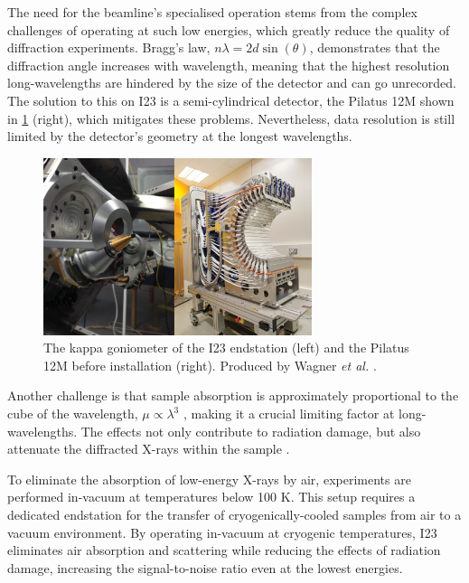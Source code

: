 The need for the beamline's specialised operation stems from the complex challenges of operating at such low energies, which greatly reduce the quality of diffraction experiments.
Bragg’s law, $nλ = 2d \sin(\theta)$, demonstrates that the diffraction angle increases with wavelength, meaning that the highest resolution long-wavelengths are hindered by the size of the detector and can go unrecorded. %
The solution to this on I23 is a semi-cylindrical detector, the Pilatus 12M shown in \cref{fig:gonio_and_detector} (right), which mitigates these problems. Nevertheless, data resolution is still limited by the detector’s geometry at the longest wavelengths.

\begin{figure}
    \centering
    \includegraphics[width = 0.7\textwidth]{images/goniometer&detector.PNG}
    \caption{The kappa goniometer of the I23 endstation (left) and the Pilatus 12M before installation (right). Produced by Wagner \textit{et al.} \cite{Wagner2016}.}
    \label{fig:gonio_and_detector}
\end{figure}

 Another challenge is that sample absorption is approximately proportional to the cube of the wavelength, $\mu \propto \lambda^3$ \cite{Arndt1984}, making it a crucial limiting factor at long-wavelengths. The effects not only contribute to radiation damage, but also attenuate the diffracted X-rays within the sample \cite{Wagner2016}.

To eliminate the absorption of low-energy X-rays by air, experiments are performed in-vacuum at temperatures below 100 K. This setup requires a dedicated endstation for the transfer of cryogenically-cooled samples from air to a vacuum environment. By operating in-vacuum at cryogenic temperatures, I23 eliminates air absorption and scattering while reducing the effects of radiation damage, increasing the signal-to-noise ratio even at the lowest energies.


